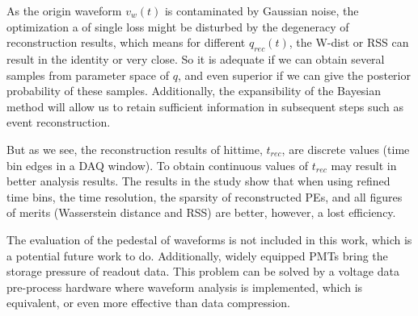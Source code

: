 
As the origin waveform $v_{w}(t)$ is contaminated by Gaussian noise, the optimization a of single loss might be disturbed by the degeneracy of reconstruction results, which means for different $q_{rec}(t)$, the W-dist or RSS can result in the identity or very close. So it is adequate if we can obtain several samples from parameter space of $q$, and even superior if we can give the posterior probability of these samples. Additionally, the expansibility of the Bayesian method will allow us to retain sufficient information in subsequent steps such as event reconstruction. 


But as we see, the reconstruction results of hittime, $t_{rec}$, are discrete values (time bin edges in a DAQ window). To obtain continuous values of $t_{rec}$ may result in better analysis results. The results in the study show that when using refined time bins, the time resolution, the sparsity of reconstructed PEs, and all figures of merits (Wasserstein distance and RSS) are better, however, a lost efficiency. 


The evaluation of the pedestal of waveforms is not included in this work, which is a potential future work to do. Additionally, widely equipped PMTs bring the storage pressure of readout data. This problem can be solved by a voltage data pre-process hardware where waveform analysis is implemented, which is equivalent, or even more effective than data compression. 

